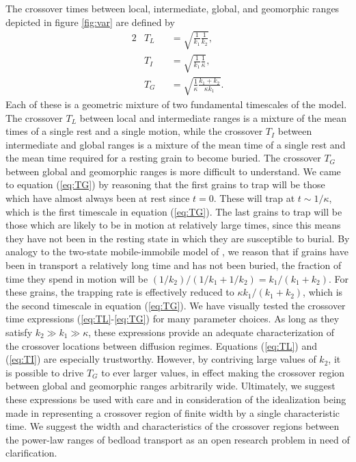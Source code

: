 \documentclass[]{agujournal2018}
\begin{document}
The crossover times between local, intermediate, global, and geomorphic ranges depicted in figure \ref{fig:var} are defined by
\begin{alignat}{2}
&T_L &&= \sqrt{\frac{1}{k_1}\frac{1}{k_2}}, \label{eq:TL}\\
&T_I &&= \sqrt{\frac{1}{k_1}\frac{1}{\kappa}},\label{eq:TI}\\
&T_G &&= \sqrt{\frac{1}{\kappa}\frac{k_1+k_2}{\kappa k_1}} \label{eq:TG}.
\end{alignat}
Each of these is a geometric mixture of two fundamental timescales of the model.
The crossover $T_L$ between local and intermediate ranges is a mixture of the mean times of a single rest and a single motion, while the crossover $T_I$ between intermediate and global ranges is a mixture of the mean time of a single rest and the mean time required for a resting grain to become buried.
The crossover $T_G$ between global and geomorphic ranges is more difficult to understand. We came to equation (\ref{eq:TG}) by reasoning that the first grains to trap will be those which have almost always been at rest since $t=0$. 
These will trap at $t\sim1/\kappa$, which is the first timescale in equation (\ref{eq:TG}). The last grains to trap will be those which are likely to be in motion at relatively large times, since this means they have not been in the resting state in which they are susceptible to burial.
By analogy to the two-state mobile-immobile model of \citet{Ancey2006}, we reason that if grains have been in transport a relatively long time and has not been buried, the fraction of time they spend in motion will be $(1/k_2)/(1/k_1+1/k_2) = k_1/(k_1+k_2)$. For these grains, the trapping rate is effectively reduced to $\kappa k_1/(k_1+k_2)$, which is the second timescale in equation (\ref{eq:TG}).
We have visually tested the crossover time expressions (\ref{eq:TL}-\ref{eq:TG}) for many parameter choices. As long as they satisfy $k_2\gg k_1 \gg \kappa$, these expressions provide an adequate characterization of the crossover locations between diffusion regimes.
Equations (\ref{eq:TL}) and (\ref{eq:TI}) are especially trustworthy.
However, by contriving large values of $k_2$, it is possible to drive $T_G$ to ever larger values, in effect making the crossover region between global and geomorphic ranges arbitrarily wide.
Ultimately, we suggest these expressions be used with care and in consideration of the idealization being made in representing a crossover region of finite width by a single characteristic time. We suggest the width and characteristics of the crossover regions between the power-law ranges of bedload transport as an open research problem in need of clarification.
\end{document}
